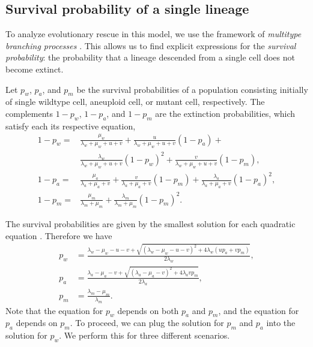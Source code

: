 \documentclass[12pt]{extarticle}
\begin{document}
\appendix
\begin{appendices}
\renewcommand{\theequation}{\thesection\arabic{equation}}

\section*{Survival probability of a single lineage}

To analyze evolutionary rescue in this model, we use the framework of \emph{multitype branching processes} \citep{rybnikov2021fitness,harris1963theory}. 
This allows us to find explicit expressions for the \emph{survival probability}: the probability that a lineage descended from a single cell does not become extinct.

Let $p_w$, $p_a$, and $p_m$ be the survival probabilities of a population consisting initially of single wildtype cell, aneuploid cell, or mutant cell, respectively.
The complements $1-p_w$, $1-p_a$, and $1-p_m$ are the extinction probabilities, which satisfy each its respective equation,
\begin{equation} \label{extinction_prob}
\begin{aligned}
1-p_w = &\frac{\mu_w}{\lambda_w+\mu_w+u+v} + 
		  \frac{u}{\lambda_w+\mu_w+u+v}\left(1-p_a\right) + \\
		  & \frac{\lambda_w}{\lambda_w+\mu_w+u+v}\left(1-p_w\right)^2 +
		  \frac{v}{\lambda_w+\mu_w+u+v}\left(1-p_m\right) ,\\
1-p_a = &\frac{\mu_a}{\lambda_a+\mu_a+v}+\frac{v}{\lambda_a+\mu_a+v}\left(1-p_m\right)+\frac{\lambda_a}{\lambda_a+\mu_a+v}\left(1-p_a\right)^2 ,\\
1-p_m = &\frac{\mu_m}{\lambda_m+\mu_m}+\frac{\lambda_m}{\lambda_m+\mu_m}\left(1-p_m\right)^2 .	 
\end{aligned}
\end{equation}

The survival probabilities are given by the smallest solution for each quadratic equation \citep{uecker2015adaptive}. Therefore we have
\begin{equation}\label{survival_prob}
\begin{aligned}
p_w &= \frac{\lambda_w-\mu_w-u-v+\sqrt{\left(\lambda_w-\mu_w-u-v\right)^2+4\lambda_w\left(up_a+vp_m\right)}}{2\lambda_w} ,\\
p_a &= \frac{\lambda_a-\mu_a-v+\sqrt{\left(\lambda_a-\mu_a-v\right)^2+4\lambda_avp_m}}{2\lambda_a}, \\
p_m &= \frac{\lambda_m-\mu_m}{\lambda_m} .
\end{aligned} 
\end{equation}
Note that the equation for $p_w$ depends on both $p_a$ and $p_m$, and the equation for $p_a$ depends on $p_m$.
To proceed, we can plug the solution for $p_m$ and $p_a$ into the solution for $p_w$. We perform this for three different scenarios.


\end{appendices}
\end{document}
